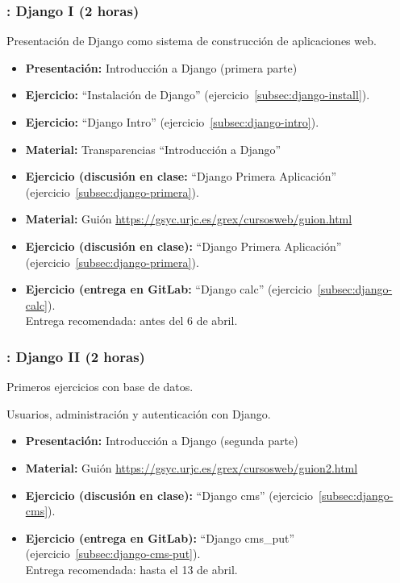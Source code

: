 \documentclass[a4paper,12pt]{article}
\begin{document}
\subsubsection{\lunesF: Django I (2 horas)}
\label{cal:lunesF}

Presentación de Django como sistema de construcción de aplicaciones web.

\begin{itemize}
 \item \textbf{Presentación:} Introducción a Django (primera parte)
 \item \textbf{Ejercicio:} ``Instalación de Django'' (ejercicio~\ref{subsec:django-install}).
 \item \textbf{Ejercicio:} ``Django Intro'' (ejercicio~\ref{subsec:django-intro}).
 \item \textbf{Material:} Transparencias ``Introducción a Django''
 \item \textbf{Ejercicio (discusión en clase:} ``Django Primera Aplicación'' (ejercicio~\ref{subsec:django-primera}).
 \item \textbf{Material:} Guión \url{https://gsyc.urjc.es/grex/cursosweb/guion.html}
 \item \textbf{Ejercicio (discusión en clase):} ``Django Primera Aplicación'' (ejercicio~\ref{subsec:django-primera}).

  \item \textbf{Ejercicio (entrega en GitLab:} ``Django calc'' (ejercicio~\ref{subsec:django-calc}). \\
    Entrega recomendada: antes del 6 de abril.
\end{itemize}


\subsubsection{\lunesG: Django II (2 horas)}
\label{cal:lunesG}

Primeros ejercicios con base de datos.

Usuarios, administración y autenticación con Django.

\begin{itemize}
 \item \textbf{Presentación:} Introducción a Django (segunda parte)
  \item \textbf{Material:} Guión \url{https://gsyc.urjc.es/grex/cursosweb/guion2.html}
 \item \textbf{Ejercicio  (discusión en clase):} ``Django cms'' (ejercicio~\ref{subsec:django-cms}). \\
 \item \textbf{Ejercicio (entrega en GitLab):} ``Django cms\_put'' (ejercicio~\ref{subsec:django-cms-put}). \\
  Entrega recomendada: hasta el 13 de abril.
\end{itemize}
\end{document}
